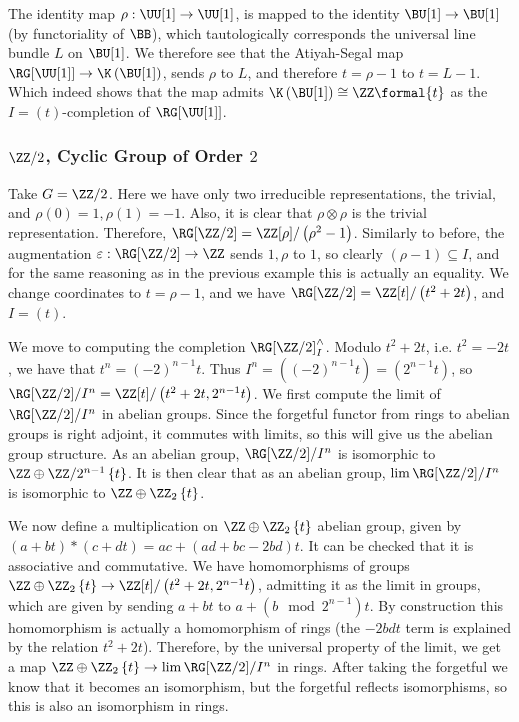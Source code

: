 The identity map $\rho: \UU[1] \to \UU[1]$, is mapped to the identity $\BU[1] \to \BU[1]$ (by functoriality of $\BB$), which tautologically corresponds the universal line bundle $L$ on $\BU[1]$.
We therefore see that the Atiyah-Segal map $\RG[\UU[1]] \to \K\left(\BU[1]\right)$, sends $\rho$ to $L$, and therefore $t = \rho - 1$ to $t = L - 1$.
Which indeed shows that the map admits $\K\left(\BU[1]\right) \cong \ZZ\formal{t}$ as the $I = \left(t\right)$-completion of $\RG[\UU[1]]$.


\subsubsection{\texorpdfstring{$\ZZ/2$}{Z/2}, Cyclic Group of Order \texorpdfstring{$2$}{2}}

Take $G = \ZZ/2$.
Here we have only two irreducible representations, the trivial, and $\rho\left(0\right) = 1, \rho\left(1\right) = -1$.
Also, it is clear that $\rho \otimes \rho$ is the trivial representation.
Therefore, $\RG[\ZZ/2] = \ZZ[\rho]/\left(\rho^2-1\right)$.
Similarly to before, the augmentation $\varepsilon: \RG[\ZZ/2] \to \ZZ$ sends $1,\rho$ to $1$, so clearly $\left(\rho-1\right) \subseteq I$, and for the same reasoning as in the previous example this is actually an equality.
We change coordinates to $t = \rho-1$, and we have $\RG[\ZZ/2] = \ZZ[t]/\left(t^2+2t\right)$, and $I = \left(t\right)$.

We move to computing the completion $\RG[\ZZ/2]_I^\wedge$.
Modulo $t^2+2t$, i.e. $t^2 = -2t$, we have that $t^n = \left(-2\right)^{n-1} t$.
Thus $I^n = \left(\left(-2\right)^{n-1} t\right) = \left(2^{n-1} t\right)$, so $\RG[\ZZ/2]/I^n = \ZZ[t]/\left(t^2+2t, 2^{n-1} t\right)$.
We first compute the limit of $\RG[\ZZ/2]/I^n$ in abelian groups.
Since the forgetful functor from rings to abelian groups is right adjoint, it commutes with limits, so this will give us the abelian group structure.
As an abelian group, $\RG[\ZZ/2]/I^n$ is isomorphic to $\ZZ \oplus \ZZ/2^{n-1}\left\{t\right\}$.
It is then clear that as an abelian group, $\lim \RG[\ZZ/2]/I^n$ is isomorphic to $\ZZ \oplus \ZZ_2\left\{t\right\}$.

We now define a multiplication on $\ZZ \oplus \ZZ_2\left\{t\right\}$ abelian group, given by $\left(a+bt\right) * \left(c+dt\right) = ac + (ad+bc-2bd)t$.
It can be checked that it is associative and commutative.
We have homomorphisms of groups $\ZZ \oplus \ZZ_2\left\{t\right\} \to \ZZ[t]/\left(t^2+2t, 2^{n-1} t\right)$, admitting it as the limit in groups, which are given by sending $a+bt$ to $a+\left(b \mod 2^{n-1}\right) t$.
By construction this homomorphism is actually a homomorphism of rings (the $-2bdt$ term is explained by the relation $t^2+2t$).
Therefore, by the universal property of the limit, we get a map $\ZZ \oplus \ZZ_2\left\{t\right\} \to \lim \RG[\ZZ/2]/I^n$ in rings.
After taking the forgetful we know that it becomes an isomorphism, but the forgetful reflects isomorphisms, so this is also an isomorphism in rings.

